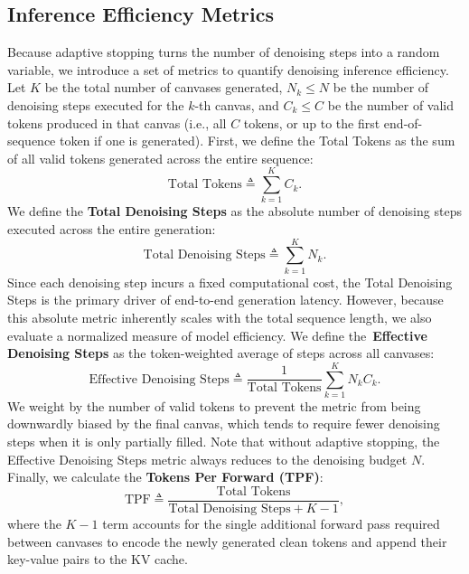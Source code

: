 \documentclass[11pt, a4paper, logo, copyright, gdm]{google}
\begin{document}
\subsection{Inference Efficiency Metrics} \label{sec:metrics}

Because adaptive stopping turns the number of denoising steps into a random variable, we introduce a set of metrics to quantify denoising inference efficiency. Let $K$ be the total number of canvases generated, $N_k \leq N$ be the number of denoising steps executed for the $k$-th canvas, and $C_k \leq C$ be the number of valid tokens produced in that canvas (i.e., all $C$ tokens, or up to the first end-of-sequence token if one is generated). First, we define the Total Tokens as the sum of all valid tokens generated across the entire sequence:
\begin{equation}\label{eq:total_tokens}
\text{Total Tokens} \triangleq \sum_{k=1}^K C_k.
\end{equation}
We define the \textbf{Total Denoising Steps} as the absolute number of denoising steps executed across the entire generation:
\begin{equation}\label{eq:total_denoising_steps}
   \text{Total Denoising Steps} \triangleq \sum_{k=1}^{K} N_k.
\end{equation}
Since each denoising step incurs a fixed computational cost, the Total Denoising Steps is the primary driver of end-to-end generation latency. However, because this absolute metric inherently scales with the total sequence length, we also evaluate a normalized measure of model efficiency. We define the~\textbf{Effective Denoising Steps} as the token-weighted average of steps across all canvases:
\begin{equation}\label{eq:effective_denoising_steps}
   \text{Effective Denoising Steps} \triangleq \frac{1}{\text{Total Tokens}} \sum_{k=1}^K N_k C_k.
\end{equation}
We weight by the number of valid tokens to prevent the metric from being downwardly biased by the final canvas, which tends to require fewer denoising steps when it is only partially filled. Note that without adaptive stopping, the Effective Denoising Steps metric always reduces to the denoising budget $N$. Finally, we calculate the \textbf{Tokens Per Forward (TPF)}:
\begin{equation}\label{eq:tpf}
   \text{TPF} \triangleq \frac{\text{Total Tokens}}{\text{Total Denoising Steps} + K - 1},
\end{equation}
where the $K-1$ term accounts for the single additional forward pass required between canvases to encode the newly generated clean tokens and append their key-value pairs to the KV cache.
\end{document}
